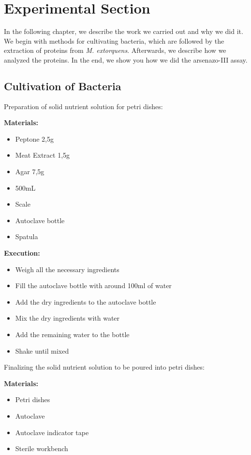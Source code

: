 \chapter{Experimental Section}

In the following chapter, we describe the work we carried out and why we did it.
We begin with methods for cultivating bacteria, which are followed by the extraction of proteins from \emph{M. extorquens}.
Afterwards, we describe how we analyzed the proteins.
In the end, we show you how we did the arsenazo-III assay.


\section{Cultivation of Bacteria\authorB}

Preparation of solid nutrient solution for petri dishes:

\textbf{Materials:}

\begin{itemize}
    \item Peptone 2,5g
    \item Meat Extract 1,5g
    \item Agar 7,5g
    \item {} 500mL
    \item Scale
    \item Autoclave bottle
    \item Spatula
\end{itemize}


\textbf{Execution:}
\begin{itemize}
    \item Weigh all the necessary ingredients
    \item Fill the autoclave bottle with around 100ml of water
    \item Add the dry ingredients to the autoclave bottle
    \item Mix the dry ingredients with water
    \item Add the remaining water to the bottle
    \item Shake until mixed
\end{itemize}


Finalizing the solid nutrient solution to be poured into petri dishes:

\textbf{Materials:}

\begin{itemize}
    \item Petri dishes
    \item Autoclave
    \item Autoclave indicator tape
    \item Sterile workbench
\end{itemize}


